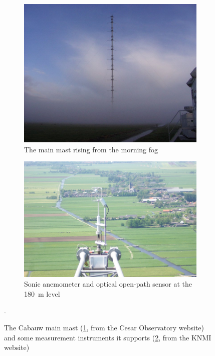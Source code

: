 \documentclass[a4paper,11pt]{kth-mag}
\begin{document}
\begin{figure}
    \centering
        \begin{subfigure}[c]{0.48\textwidth}
        \centering
		\includegraphics[width=\textwidth]{images/cabauw_tower}
		\caption{The main mast rising from the morning fog}
		\label{fig:cabauw_main_mast}
    \end{subfigure}
    \hfill
    \begin{subfigure}[c]{0.48\textwidth}
        \centering
		\includegraphics[width=\textwidth]{images/cabauw_turbulence_instruments}
		\caption{Sonic anemometer and optical open-path sensor at the \SI{180}{\meter} level}
		\label{fig:cabauw_180m}
    \end{subfigure}
    
\caption[The Cabauw main mast (\ref{fig:cabauw_main_mast}, from the Cesar Observatory website) and some measurement instruments it supports (\ref{fig:cabauw_180m}, from the KNMI website)]{The Cabauw main mast (\ref{fig:cabauw_main_mast}, from the Cesar Observatory website\protect\footnotemark) and some measurement instruments it supports (\ref{fig:cabauw_180m}, from the KNMI website\protect\footnotemark)}.
\label{fig:cabauw_tower}
\end{figure}
\end{document}
